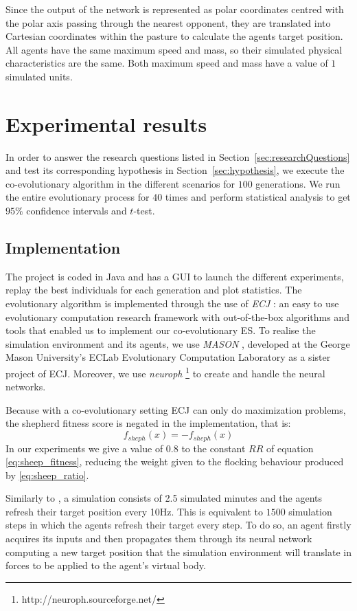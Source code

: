\documentclass[conference]{IEEEtran}
\begin{document}
Since the output of the network is represented as polar coordinates centred with the polar axis passing through the nearest opponent, they are translated into Cartesian coordinates within the pasture to calculate the agents target position.
All agents have the same maximum speed and mass, so their simulated physical characteristics are the same.
Both maximum speed and mass have a value of $1$ simulated units.



\section{Experimental results}
\label{sec:experiment}
In order to answer the research questions listed in {Section~\ref{sec:researchQuestions}} and test its corresponding hypothesis in {Section~\ref{sec:hypothesis}}, we execute the co-evolutionary algorithm in the different scenarios for $100$ generations. 
We run the entire evolutionary process for $40$ times and perform statistical analysis to get $95\%$ confidence intervals and $t$-test.

\subsection{Implementation}
\label{sec:implementation}
The project is coded in Java and has a GUI to launch the different experiments, replay the best individuals for each generation and plot statistics.
The evolutionary algorithm is implemented through the use of \textit{ECJ} \cite{luke2006ecj}: an easy to use evolutionary computation research framework with out-of-the-box algorithms and tools that enabled us to implement our co-evolutionary ES.
To realise the simulation environment and its agents, we use \textit{MASON} \cite{luke2005mason}, developed at the George Mason University's ECLab Evolutionary Computation Laboratory as a sister project of ECJ.
Moreover, we use \textit{neuroph} \footnote{http://neuroph.sourceforge.net/} to create and handle the neural networks.

Because with a co-evolutionary setting ECJ can only do maximization problems, the shepherd fitness score is negated in the implementation, that is:
$$ f_{sheph}(x) = -f_{sheph}(x) $$
In our experiments we give a value of $0.8$ to the constant $RR$ of equation \eqref{eq:sheep_fitness}, reducing the weight given to the flocking behaviour produced by \eqref{eq:sheep_ratio}.

Similarly to \cite{potter2001heterogeneity}, a simulation consists of 2.5 simulated minutes and the agents refresh their target position every 10Hz.
This is equivalent to $1500$ simulation steps in which the agents refresh their target every step.
To do so, an agent firstly acquires its inputs and then propagates them through its neural network computing a new target position that the simulation environment will translate in forces to be applied to the agent's virtual body.
\end{document}
